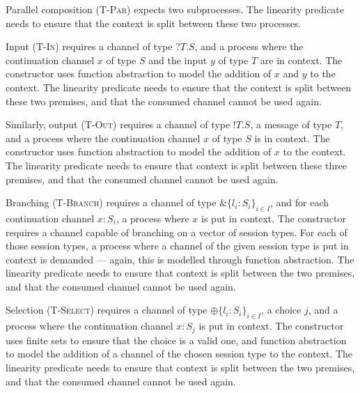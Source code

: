 \documentclass{mproj}
\newcommand{\Send}[1]{!#1.}
\newcommand{\Recv}[1]{?#1.}
\newcommand{\Select}{\oplus}
\newcommand{\Branch}{\&}
\begin{document}

Parallel composition (\textsc{T-Par}) expects two subprocesses. The linearity predicate needs to ensure that the context is split between these two processes.


Input (\textsc{T-In}) requires a channel of type $\Recv{T}S$, and a process where the continuation channel $x$ of type $S$ and the input $y$ of type $T$ are in context. The  constructor uses function abstraction to model the addition of $x$ and $y$ to the context. The linearity predicate needs to ensure that the context is split between these two premises, and that the consumed channel cannot be used again.


Similarly, output (\textsc{T-Out}) requires a channel of type $\Send{T}S$, a message of type $T$, and a process where the continuation channel $x$ of type $S$ is in context. The  constructor uses function abstraction to model the addition of $x$ to the context. The linearity predicate needs to ensure that context is split between these three premises, and that the consumed channel cannot be used again.


Branching (\textsc{T-Branch}) requires a channel of type $\Branch \{l_i : S_i\}_{i \in I}$, and for each continuation channel $x : S_i$, a process where $x$ is put in context. The  constructor requires a channel capable of branching on a vector of session types. For each of those session types, a process where a channel of the given session type is put in context is demanded --- again, this is modelled through function abstraction. The linearity predicate needs to ensure that context is split between the two premises, and that the consumed channel cannot be used again.


Selection (\textsc{T-Select}) requires a channel of type $\Select \{l_i : S_i\}_{i \in I}$, a choice $j$, and a process where the continuation channel $x : S_j$ is put in context. The  constructor uses finite sets to ensure that the choice is a valid one, and function abstraction to model the addition of a channel of the chosen session type to the context. The linearity predicate needs to ensure that context is split between the two premises, and that the consumed channel cannot be used again.
\end{document}
